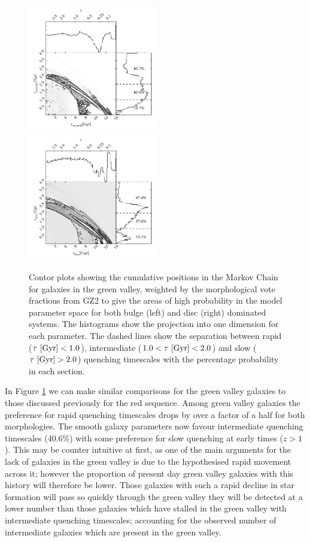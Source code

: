 \documentclass[useAMS,usenatbib]{mn2e}
\def\changed    {\color{titlecol} }
\begin{document}
\begin{figure}
\includegraphics[width=0.4975\textwidth]{green_smooth.pdf}
\includegraphics[width=0.4975\textwidth]{green_disc.pdf}
\caption[8pt]{{\changed Contor plots showing the cumulative positions in the Markov Chain for galaxies in the green valley, weighted by the morphological vote fractious from GZ2 to give the areas of high probability in the model parameter space for both bulge (left) and disc (right) dominated systems. The histograms show the projection into one dimension for each parameter. The dashed lines show the separation between rapid ($\tau ~\rm{[Gyr]} < 1.0$), intermediate ($1.0 < \tau ~\rm{[Gyr]} < 2.0$) and slow ($\tau ~\rm{[Gyr]} > 2.0$) quenching timescales with the percentage probability in each section.}}
\label{green_v}
\end{figure}

In Figure \ref{green_v} we can make similar comparisons for the green valley galaxies to those discussed previously for the red sequence. {\changed Among green valley galaxies the preference for rapid quenching timescales drops by over a factor of a half for both morphologies. The smooth galaxy parameters now favour intermediate quenching timescales ($40.6\%$) with some preference for slow quenching at  early times ($z > 1$).} This may be counter intuitive at first, as one of the main arguments for the lack of galaxies in the green valley is due to the hypothesised rapid movement across it; however the proportion of present day green valley galaxies with this history will therefore be lower. {\changed Those galaxies with such a rapid decline in star formation will pass so quickly through the green valley they will be detected at a lower number than those galaxies which have stalled in the green valley with intermediate quenching timescales;} accounting for the observed number of intermediate galaxies which are present in the green valley.
\end{document}
